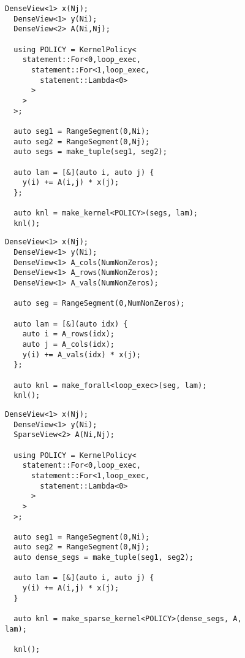 \begin{figure}
  \begin{lstlisting}[caption={RAJA implementation of dense matrix vector multiplication.},label=DenseMV]
  DenseView<1> x(Nj);
  DenseView<1> y(Ni);
  DenseView<2> A(Ni,Nj);
  
  using POLICY = KernelPolicy<
    statement::For<0,loop_exec,
      statement::For<1,loop_exec,
        statement::Lambda<0>
      >
    >
  >;
  
  auto seg1 = RangeSegment(0,Ni);
  auto seg2 = RangeSegment(0,Nj);
  auto segs = make_tuple(seg1, seg2);
  
  auto lam = [&](auto i, auto j) {
    y(i) += A(i,j) * x(j);
  };
  
  auto knl = make_kernel<POLICY>(segs, lam);
  knl();
  \end{lstlisting}
  \end{figure}
  \begin{figure}
  \begin{lstlisting}[caption={RAJA implementation of sparse matrix vector multiplication, specialized for COO storage.},label=SpecializedMV]
  DenseView<1> x(Nj);
  DenseView<1> y(Ni);
  DenseView<1> A_cols(NumNonZeros);
  DenseView<1> A_rows(NumNonZeros);
  DenseView<1> A_vals(NumNonZeros);
  
  auto seg = RangeSegment(0,NumNonZeros);
  
  auto lam = [&](auto idx) {
    auto i = A_rows(idx);
    auto j = A_cols(idx);
    y(i) += A_vals(idx) * x(j);
  };
  
  auto knl = make_forall<loop_exec>(seg, lam);
  knl();
  \end{lstlisting}
  \end{figure}
  \begin{figure}
  \begin{lstlisting}[caption={Implementation of SpMV using the SparseRAJA prototype},label=SparseRAJAMV]
  DenseView<1> x(Nj);
  DenseView<1> y(Ni);
  SparseView<2> A(Ni,Nj);
  
  using POLICY = KernelPolicy<
    statement::For<0,loop_exec,
      statement::For<1,loop_exec,
        statement::Lambda<0>
      >
    >
  >;
  
  auto seg1 = RangeSegment(0,Ni);
  auto seg2 = RangeSegment(0,Nj);
  auto dense_segs = make_tuple(seg1, seg2);
  
  auto lam = [&](auto i, auto j) {
    y(i) += A(i,j) * x(j);
  }
  
  auto knl = make_sparse_kernel<POLICY>(dense_segs, A, lam);
    
  knl();
  \end{lstlisting}
  \end{figure}
  


